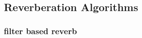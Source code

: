 \documentclass[paper=a4, fontsize=10pt, font=arial]{scrartcl} %
\numberwithin{equation}{section} %
\numberwithin{figure}{section} %
\numberwithin{table}{section} %
\begin{document}


\newpage
\subsection{Reverberation Algorithms}
\subsubsection{filter based reverb}

\end{document}
